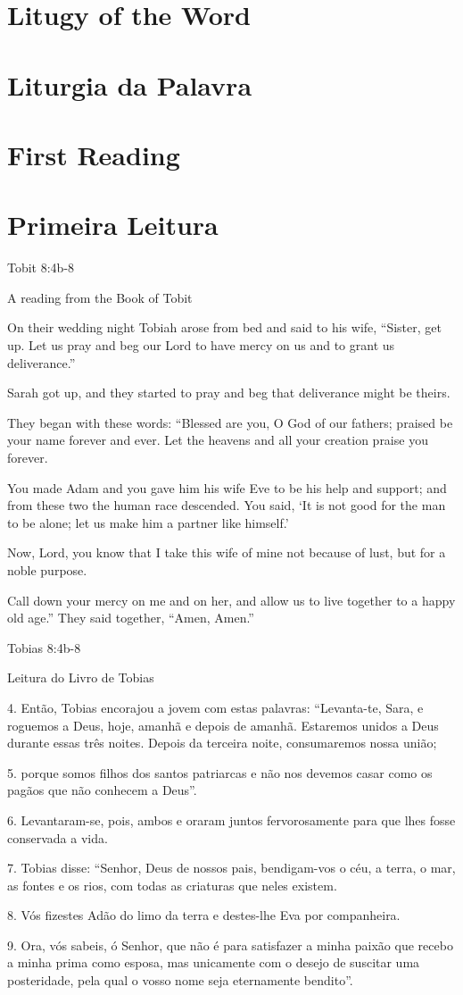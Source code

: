 \documentclass[10pt,a5]{article}
\newcommand \sect[2] {\section*{#1} \switchcolumn \section*{#2} \switchcolumn*}
\begin{document}
\begin{paracol}{2}

 \sect{Litugy of the Word}{Liturgia da Palavra}

 \sect{First Reading}{Primeira Leitura}

Tobit 8:4b-8

A reading from the Book of Tobit

On their wedding night Tobiah arose from bed and said to his wife,
“Sister, get up. Let us pray and beg our Lord to have mercy on
us and to grant us deliverance.”

Sarah got up, and they started to pray
and beg that deliverance might be theirs.

They began with these words:
“Blessed are you, O God of our fathers;
praised be your name forever and ever.
Let the heavens and all your creation
praise you forever.

You made Adam and you gave him his wife Eve to be his help
and support;
and from these two the human race descended.
You said, ‘It is not good for the man to be alone;
let us make him a partner like himself.’

Now, Lord, you know that I take this wife of mine not because
of lust,
but for a noble purpose.

Call down your mercy on me and on her,
and allow us to live together to a happy old age.”
They said together, “Amen, Amen.”


\switchcolumn

Tobias 8:4b-8

Leitura do Livro de Tobias

4.
Então, Tobias encorajou a jovem com estas palavras: “Levanta-te, Sara, e roguemos a Deus, hoje, amanhã e depois de amanhã. Estaremos unidos a Deus durante essas três noites. Depois da terceira noite, consumaremos nossa união;

5.
porque somos filhos dos santos patriarcas e não nos devemos casar como os pagãos que não conhecem a Deus”.

6.
Levantaram-se, pois, ambos e oraram juntos fervorosamente para que lhes fosse conservada a vida.

7.
Tobias disse: “Senhor, Deus de nossos pais, bendigam-vos o céu, a terra, o mar, as fontes e os rios, com todas as criaturas que neles existem.

8.
Vós fizestes Adão do limo da terra e destes-lhe Eva por companheira.

9.
Ora, vós sa­beis, ó Senhor, que não é para satisfazer a minha paixão que recebo a minha prima como esposa, mas unicamente com o desejo de suscitar uma posteridade, pela qual o vosso nome seja eternamente bendito”.


\end{paracol}
\end{document}
